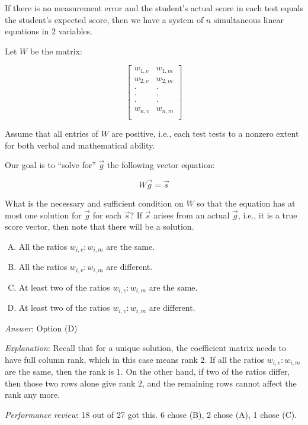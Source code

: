 \documentclass[10pt]{amsart}
\begin{document}
\begin{enumerate}
  If there is no measurement error and the student's actual score in
  each test equals the student's expected score, then we have a system
  of $n$ simultaneous linear equations in $2$ variables.

  Let $W$ be the matrix:

  $$\left[\begin{matrix} w_{1,v} & w_{1,m} \\ w_{2,v} & w_{2,m} \\ \cdot & \cdot \\ \cdot & \cdot \\ \cdot & \cdot \\ w_{n,v} & w_{n,m} \\\end{matrix}\right]$$

  Assume that all entries of $W$ are positive, i.e., each test tests
  to a nonzero extent for both verbal and mathematical ability.

  Our goal is to ``solve for'' $\vec{g}$ the following vector
  equation:

  $$W\vec{g} = \vec{s}$$

  What is the necessary and sufficient condition on $W$ so that the
  equation has at most one solution for $\vec{g}$ for each $\vec{s}$?
  If $\vec{s}$ arises from an actual $\vec{g}$, i.e., it is a true
  score vector, then note that there will be a solution.

  \begin{enumerate}[(A)]
  \item All the ratios $w_{i,v}:w_{i,m}$ are the same.
  \item All the ratios $w_{i,v}:w_{i,m}$ are different.
  \item At least two of the ratios $w_{i,v}:w_{i,m}$ are the same.
  \item At least two of the ratios $w_{i,v}:w_{i,m}$ are different.
  \end{enumerate}

  {\em Answer}: Option (D)

  {\em Explanation}: Recall that for a unique solution, the
  coefficient matrix needs to have full column rank, which in this
  case means rank $2$. If all the ratios $w_{i,v}:w_{i,m}$ are the
  same, then the rank is $1$. On the other hand, if two of the ratios
  differ, then those two rows alone give rank $2$, and the remaining
  rows cannot affect the rank any more.

  {\em Performance review}: 18 out of 27 got this. 6 chose (B), 2
  chose (A), 1 chose (C).


\end{enumerate}
\end{document}

